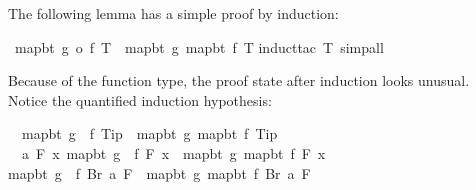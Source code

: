 \begin{isabellebody}
\begin{isamarkuptext}
The following lemma has a simple proof by induction:%
\end{isamarkuptext}%
\isamarkuptrue%
\ {\isachardoublequote}map{\isacharunderscore}bt\ {\isacharparenleft}g\ o\ f{\isacharparenright}\ T\ {\isacharequal}\ map{\isacharunderscore}bt\ g\ {\isacharparenleft}map{\isacharunderscore}bt\ f\ T{\isacharparenright}{\isachardoublequote}\isanewline
\isamarkupfalse%
induct{\isacharunderscore}tac\ T{\isacharcomma}\ simp{\isacharunderscore}all{\isacharparenright}\isanewline
\isamarkupfalse%
\isamarkupfalse%
\isamarkupfalse%
\isamarkupfalse%
%
\begin{isamarkuptxt}%
\noindent
Because of the function type, the proof state after induction looks unusual.
Notice the quantified induction hypothesis:
\begin{isabelle}%
\ {}{\isachardot}\ map{\isacharunderscore}bt\ {\isacharparenleft}g\ {\isasymcirc}\ f{\isacharparenright}\ Tip\ {\isacharequal}\ map{\isacharunderscore}bt\ g\ {\isacharparenleft}map{\isacharunderscore}bt\ f\ Tip{\isacharparenright}\isanewline
\ {}{\isachardot}\ {\isasymAnd}a\ F{\isachardot}\ {\isacharparenleft}{\isasymAnd}x{\isachardot}\ map{\isacharunderscore}bt\ {\isacharparenleft}g\ {\isasymcirc}\ f{\isacharparenright}\ {\isacharparenleft}F\ x{\isacharparenright}\ {\isacharequal}\ map{\isacharunderscore}bt\ g\ {\isacharparenleft}map{\isacharunderscore}bt\ f\ {\isacharparenleft}F\ x{\isacharparenright}{\isacharparenright}{\isacharparenright}\ {\isasymLongrightarrow}\isanewline
{}map{\isacharunderscore}bt\ {\isacharparenleft}g\ {\isasymcirc}\ f{\isacharparenright}\ {\isacharparenleft}Br\ a\ F{\isacharparenright}\ {\isacharequal}\ map{\isacharunderscore}bt\ g\ {\isacharparenleft}map{\isacharunderscore}bt\ f\ {\isacharparenleft}Br\ a\ F{\isacharparenright}{\isacharparenright}%
\end{isabelle}%
\end{isamarkuptxt}%
\isamarkuptrue%
\isamarkupfalse%
\isanewline
\isamarkupfalse%
\end{isabellebody}%
